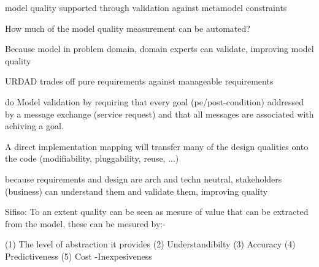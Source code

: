 model quality supported through validation against metamodel constraints

How much of the model quality measurement can be automated?

Because model in problem domain, domain experts can validate, improving model quality

URDAD trades off pure requirements against manageable requirements

\cite{graham_requirements_2008} do Model validation by requiring that every goal (pe/post-condition) addressed by a message exchange (service request) and that all messages are associated with achiving a goal.

A direct implementation mapping will transfer many of the design qualities onto the code (modifiability, pluggability, reuse, ...)

because requirements and design are arch and techn neutral, stakeholders (business) can understand them and validate them, improving quality


Sifiso:
To an extent quality can be seen as mesure of value that can be extracted from the model, these can be mesured by:-

(1) The level of abstraction it provides
(2) Understandibilty 
(3) Accuracy 
(4) Predictiveness
(5) Cost -Inexpesiveness 
\cite{selic_pragmatic_mdd_20003}
